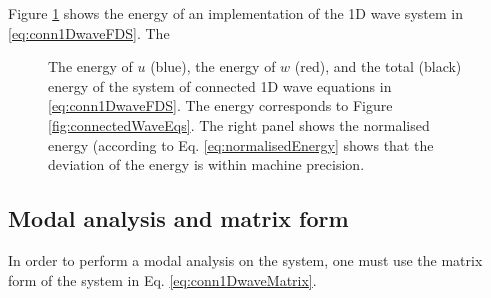 Figure \ref{fig:energyConn1DWave} shows the energy of an implementation of the 1D wave system in \eqref{eq:conn1DwaveFDS}. The 
\begin{figure}[h]
    \centering
      \caption{The energy of $u$ (blue), the energy of $w$ (red), and the total (black) energy of the system of connected 1D wave equations in \eqref{eq:conn1DwaveFDS}. The energy corresponds to Figure \ref{fig:connectedWaveEqs}. The right panel shows the normalised energy (according to Eq. \eqref{eq:normalisedEnergy} shows that the deviation of the energy is within machine precision. \label{fig:energyConn1DWave}}
\end{figure}

\subsection{Modal analysis and matrix form}
In order to perform a modal analysis on the system, one must use the matrix form of the system in Eq. \eqref{eq:conn1DwaveMatrix}. 

